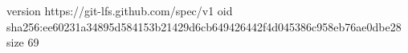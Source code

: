 version https://git-lfs.github.com/spec/v1
oid sha256:ee60231a34895d584153b21429d6cb649426442f4d045386c958eb76ae0dbe28
size 69
